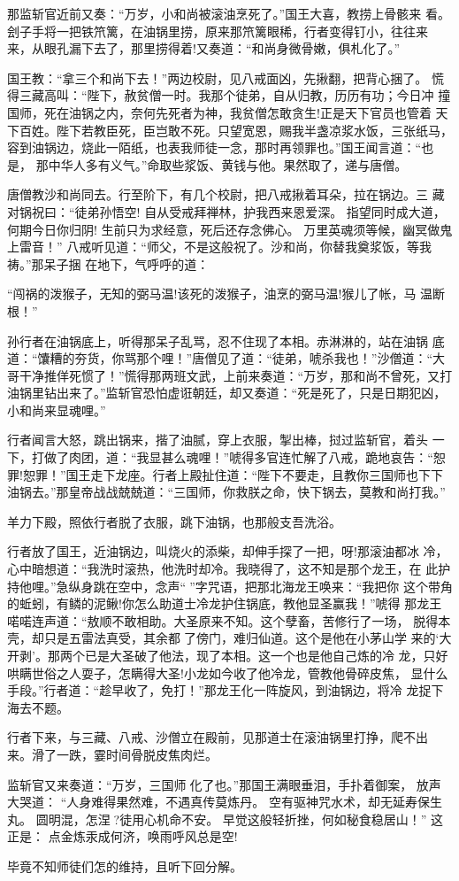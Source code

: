 那监斩官近前又奏：“万岁，小和尚被滚油烹死了。”国王大喜，教捞上骨骸来
看。刽子手将一把铁笊篱，在油锅里捞，原来那笊篱眼稀，行者变得钉小，往往来
来，从眼孔漏下去了，那里捞得着!又奏道：“和尚身微骨嫩，俱札化了。”

国王教：“拿三个和尚下去！”两边校尉，见八戒面凶，先揪翻，把背心捆了。
慌得三藏高叫：“陛下，赦贫僧一时。我那个徒弟，自从归教，历历有功；今日冲
撞国师，死在油锅之内，奈何先死者为神，我贫僧怎敢贪生!正是天下官员也管着
天下百姓。陛下若教臣死，臣岂敢不死。只望宽恩，赐我半盏凉浆水饭，三张纸马，
容到油锅边，烧此一陌纸，也表我师徒一念，那时再领罪也。”国王闻言道：“也是，
那中华人多有义气。”命取些浆饭、黄钱与他。果然取了，递与唐僧。

唐僧教沙和尚同去。行至阶下，有几个校尉，把八戒揪着耳朵，拉在锅边。三
藏对锅祝曰：“徒弟孙悟空!
自从受戒拜禅林，护我西来恩爱深。
指望同时成大道，何期今日你归阴!
生前只为求经意，死后还存念佛心。
万里英魂须等候，幽冥做鬼上雷音！”
八戒听见道：“师父，不是这般祝了。沙和尚，你替我奠浆饭，等我祷。”那呆子捆
在地下，气呼呼的道：

“闯祸的泼猴子，无知的弼马温!该死的泼猴子，油烹的弼马温!猴儿了帐，马
温断根！”

孙行者在油锅底上，听得那呆子乱骂，忍不住现了本相。赤淋淋的，站在油锅
底道：“馕糟的夯货，你骂那个哩！”唐僧见了道：“徒弟，唬杀我也！”沙僧道：“大
哥干净推佯死惯了！”慌得那两班文武，上前来奏道：“万岁，那和尚不曾死，又打
油锅里钻出来了。”监斩官恐怕虚诳朝廷，却又奏道：“死是死了，只是日期犯凶，
小和尚来显魂哩。”

行者闻言大怒，跳出锅来，揩了油腻，穿上衣服，掣出棒，挝过监斩官，着头
一下，打做了肉团，道：“我显甚么魂哩！”唬得多官连忙解了八戒，跪地哀告：“恕
罪!恕罪！”国王走下龙座。行者上殿扯住道：“陛下不要走，且教你三国师也下下
油锅去。”那皇帝战战兢兢道：“三国师，你救朕之命，快下锅去，莫教和尚打我。”

羊力下殿，照依行者脱了衣服，跳下油锅，也那般支吾洗浴。

行者放了国王，近油锅边，叫烧火的添柴，却伸手探了一把，呀!那滚油都冰
冷，心中暗想道：“我洗时滚热，他洗时却冷。我晓得了，这不知是那个龙王，在
此护持他哩。”急纵身跳在空中，念声“”字咒语，把那北海龙王唤来：“我把你
这个带角的蚯蚓，有鳞的泥鳅!你怎么助道士冷龙护住锅底，教他显圣赢我！”唬得
那龙王喏喏连声道：“敖顺不敢相助。大圣原来不知。这个孽畜，苦修行了一场，
脱得本壳，却只是五雷法真受，其余都了傍门，难归仙道。这个是他在小茅山学
来的‘大开剥’。那两个已是大圣破了他法，现了本相。这一个也是他自己炼的冷
龙，只好哄瞒世俗之人耍子，怎瞒得大圣!小龙如今收了他冷龙，管教他骨碎皮焦，
显什么手段。”行者道：“趁早收了，免打！”那龙王化一阵旋风，到油锅边，将冷
龙捉下海去不题。

行者下来，与三藏、八戒、沙僧立在殿前，见那道士在滚油锅里打挣，爬不出
来。滑了一跌，霎时间骨脱皮焦肉烂。

监斩官又来奏道：“万岁，三国师化了也。”那国王满眼垂泪，手扑着御案，
放声大哭道：
“人身难得果然难，不遇真传莫炼丹。
空有驱神咒水术，却无延寿保生丸。
圆明混，怎涅?徒用心机命不安。
早觉这般轻折挫，何如秘食稳居山！”
这正是：
点金炼汞成何济，唤雨呼风总是空!

毕竟不知师徒们怎的维持，且听下回分解。